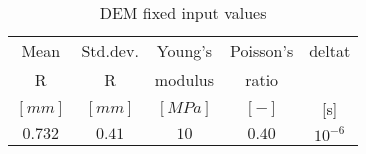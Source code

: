 \begin{table}[h]
\centering
\begin{tabular}{ccccc}
\hline
    Mean & Std.dev.  & Young's & Poisson's & \acs{deltat}\\
    \acs{R} & \acs{R} & modulus & ratio & \\
    $[mm]$  & $[mm]$  & $[MPa]$ & $[-]$ & [s]\\
    \hline
    $0.732$ & $0.41$ & $10$    & $0.40$ & $10^{-6}$\\


\hline
\end{tabular}
\caption{DEM fixed input values}
\label{tab:09DEMFixedinputvalues}
\end{table}